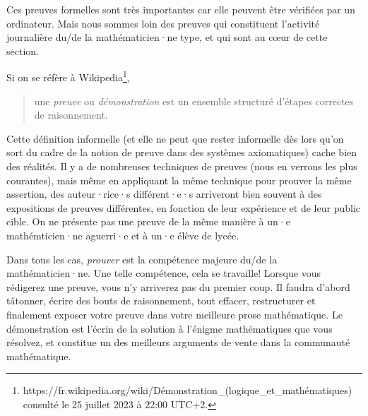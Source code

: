 \documentclass[french,course,oneside,theoremnosection]{lecture}
\begin{document}
Ces preuves formelles sont très importantes car elle peuvent être vérifiées par un ordinateur. Mais nous sommes loin des preuves qui constituent l'activité journalière du/de la mathématicien·ne type, et qui sont au cœur de cette section.

Si on se réfère à Wikipedia\footnote{https://fr.wikipedia.org/wiki/Démonstration\_(logique\_et\_mathématiques) consulté le 25 juillet 2023 à 22:00 UTC+2.},
\begin{quotation}
 une \emph{preuve} ou \emph{démonstration} est un ensemble structuré d'étapes correctes de raisonnement. 
\end{quotation}
Cette définition informelle (et elle ne peut que rester informelle dès lors qu'on sort du cadre de la notion de preuve dans des systèmes axiomatiques) cache bien des réalités. Il y a de nombreuses techniques de preuves (nous en verrons les plus courantes), mais même en appliquant la même technique pour prouver la même assertion, des auteur·rice·s différent·e·s arriveront bien souvent à des expositions de preuves différentes, en fonction de leur expérience et de leur public cible. On ne présente pas une preuve de la même manière à un·e mathémticien·ne aguerri·e et à un·e élève de lycée.

Dans tous les cas, \emph{prouver} est la compétence majeure du/de la mathématicien·ne. Une telle compétence, cela se travaille! Lorsque vous rédigerez une preuve, vous n'y arriverez pas du premier coup. Il faudra d'abord tâtonner, écrire des bouts de raisonnement, tout effacer, restructurer et finalement exposer votre preuve dans votre meilleure prose mathématique. Le démonstration est l'écrin de la solution à l'énigme mathématiques que vous résolvez, et constitue un des meilleurs arguments de vente dans la communauté mathématique.
\end{document}
